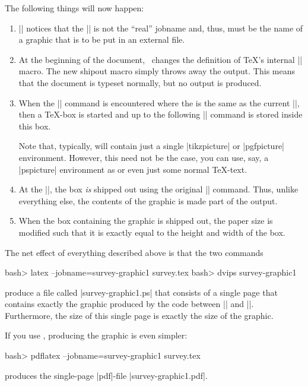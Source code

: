 The following things will now happen:
%
\begin{enumerate}
    \item |\pgfrealjobname| notices that the |\jobname| is not the ``real''
        jobname and, thus, must be the name of a graphic that is to be put in
        an external file.
    \item At the beginning of the document, \pgfname\ changes the definition of
        \TeX's internal |\shipout| macro. The new shipout macro simply throws
        away the output. This means that the document is typeset normally, but
        no output is produced.
    \item When the || command is
        encountered where the  is the same as the current
        |\jobname|, then a \TeX-box is started and  up to the
        following |\endpgfgraphicnamed| command is stored inside this box.

        Note that, typically,  will contain just a single
        |{tikzpicture}| or |{pgfpicture}| environment. However, this need not
        be the case, you can use, say, a |{pspicture}| environment as
         or even just some normal \TeX-text.
    \item At the |\endpgfgraphicnamed|, the box \emph{is} shipped out using the
        original |\shipout| command. Thus, unlike everything else, the contents
        of the graphic is made part of the output.
    \item When the box containing the graphic is shipped out, the paper size is
        modified such that it is exactly equal to the height and width of the
        box.
\end{enumerate}

The net effect of everything described above is that the two commands
%
\begin{codeexample}[code only, tikz syntax=false]
bash> latex --jobname=survey-graphic1 survey.tex
bash> dvips survey-graphic1
\end{codeexample}
%
\noindent produce a file called |survey-graphic1.ps| that consists of a single
page that contains exactly the graphic produced by the code between
|| and |\endpgfgraphicnamed|.
Furthermore, the size of this single page is exactly the size of the graphic.

If you use , producing the graphic is even simpler:
%
\begin{codeexample}[code only, tikz syntax=false]
bash> pdflatex --jobname=survey-graphic1 survey.tex
\end{codeexample}
%
\noindent produces the single-page |pdf|-file |survey-graphic1.pdf|.


